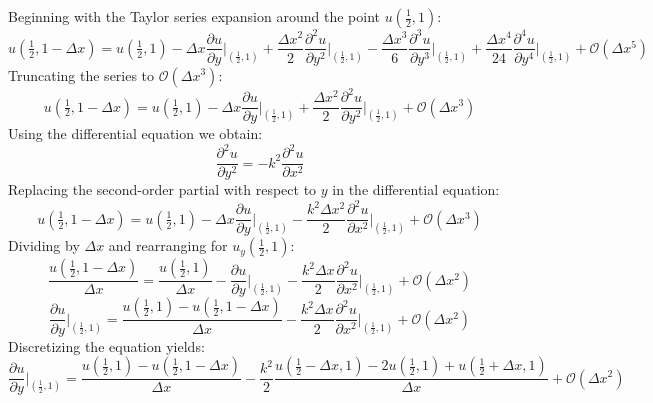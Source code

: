 \documentclass[10pt]{article}		%
\numberwithin{equation}{section}
\newcommand{\pder}[2]{\frac{\partial#1}{\partial#2}}			%
\newcommand{\psder}[2]{\dfrac{\partial^2#1}{\partial#2^2}}		%
\newcommand{\ptder}[2]{\dfrac{\partial^3#1}{\partial#2^3}}		%
\newcommand{\pfder}[2]{\dfrac{\partial^4#1}{\partial#2^4}}		%
\begin{document}
Beginning with the Taylor series expansion around the point $u(\tfrac{1}{2}, 1)$:
\begin{equation}
u(\tfrac{1}{2}, 1-\Delta x) = u(\tfrac{1}{2}, 1) - \Delta x \pder{u}{y}\Big|_{\left(\tfrac{1}{2}, 1\right)} + \frac{\Delta x^2}{2} \psder{u}{y}\Big|_{\left(\tfrac{1}{2}, 1\right)} - \frac{\Delta x^3}{6} \ptder{u}{y}\Big|_{\left(\tfrac{1}{2}, 1\right)} + \frac{\Delta x^4}{24} \pfder{u}{y}\Big|_{\left(\tfrac{1}{2}, 1\right)} + \mathcal{O}(\Delta x^5)
\end{equation}
Truncating the series to $\mathcal{O}(\Delta x^3)$:
\begin{equation}
u(\tfrac{1}{2}, 1-\Delta x) = u(\tfrac{1}{2}, 1) - \Delta x \pder{u}{y}\Big|_{\left(\tfrac{1}{2}, 1\right)} + \frac{\Delta x^2}{2} \psder{u}{y}\Big|_{\left(\tfrac{1}{2}, 1\right)} + \mathcal{O}(\Delta x^3)
\end{equation}
Using the differential equation we obtain:
\begin{equation}
\psder{u}{y} = -k^2\psder{u}{x}
\end{equation}
Replacing the second-order partial with respect to $y$ in the differential equation:
\begin{equation}
u(\tfrac{1}{2}, 1-\Delta x) = u(\tfrac{1}{2}, 1) - \Delta x \pder{u}{y}\Big|_{\left(\tfrac{1}{2}, 1\right)} - \frac{k^2\Delta x^2}{2} \psder{u}{x}\Big|_{\left(\tfrac{1}{2}, 1\right)} + \mathcal{O}(\Delta x^3)
\end{equation}
Dividing by $\Delta x$ and rearranging for $u_y(\tfrac{1}{2}, 1)$:
\begin{equation}
\frac{u(\tfrac{1}{2}, 1-\Delta x)}{\Delta x} = \frac{u(\tfrac{1}{2}, 1)}{\Delta x} - \pder{u}{y}\Big|_{\left(\tfrac{1}{2}, 1\right)} - \frac{k^2\Delta x}{2} \psder{u}{x}\Big|_{\left(\tfrac{1}{2}, 1\right)} + \mathcal{O}(\Delta x^2)
\end{equation}
\begin{equation}
\pder{u}{y}\Big|_{\left(\tfrac{1}{2}, 1\right)} = \frac{u(\tfrac{1}{2}, 1) - u(\tfrac{1}{2}, 1-\Delta x)}{\Delta x} - \frac{k^2\Delta x}{2} \psder{u}{x}\Big|_{\left(\tfrac{1}{2}, 1\right)} + \mathcal{O}(\Delta x^2)
\end{equation}
Discretizing the equation yields:
\begin{equation}
\pder{u}{y}\Big|_{\left(\tfrac{1}{2}, 1\right)} = \frac{u(\tfrac{1}{2}, 1) - u(\tfrac{1}{2}, 1-\Delta x)}{\Delta x} - \frac{k^2}{2}\frac{u(\tfrac{1}{2}-\Delta x, 1) - 2u(\tfrac{1}{2}, 1) + u(\tfrac{1}{2}+\Delta x, 1)}{\Delta x} + \mathcal{O}(\Delta x^2)
\end{equation}
\end{document}
